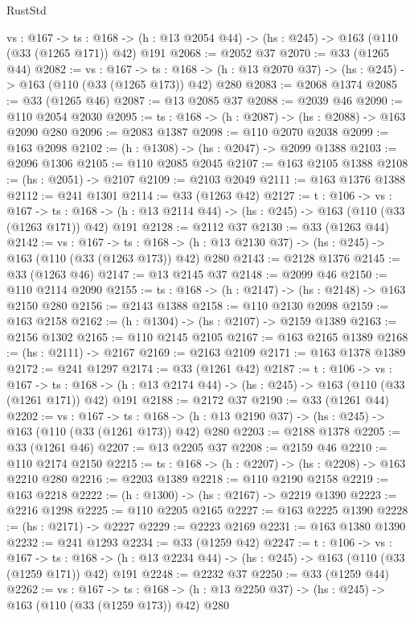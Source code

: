 \begin{lexlean}{RustStd}
\begin{coremodule}
  {vs : @167} ->
  {ts : @168} -> (h : @13 @2054 @44) -> (hs : @245) -> @163 (@110 (@33 (@1265 @171)) @42) @191
@2068 := @2052 @37
@2070 := @33 (@1265 @44)
@2082 := {vs : @167} ->
  {ts : @168} -> (h : @13 @2070 @37) -> (hs : @245) -> @163 (@110 (@33 (@1265 @173)) @42) @280
@2083 := @2068 @1374
@2085 := @33 (@1265 @46)
@2087 := @13 @2085 @37
@2088 := @2039 @46
@2090 := @110 @2054 @2030
@2095 := {ts : @168} -> (h : @2087) -> (hs : @2088) -> @163 @2090 @280
@2096 := @2083 @1387
@2098 := @110 @2070 @2038
@2099 := @163 @2098
@2102 := (h : @1308) -> (hs : @2047) -> @2099 @1388
@2103 := @2096 @1306
@2105 := @110 @2085 @2045
@2107 := @163 @2105 @1388
@2108 := (hs : @2051) -> @2107
@2109 := @2103 @2049
@2111 := @163 @1376 @1388
@2112 := @241 @1301
@2114 := @33 (@1263 @42)
@2127 := {t : @106} ->
  {vs : @167} ->
  {ts : @168} -> (h : @13 @2114 @44) -> (hs : @245) -> @163 (@110 (@33 (@1263 @171)) @42) @191
@2128 := @2112 @37
@2130 := @33 (@1263 @44)
@2142 := {vs : @167} ->
  {ts : @168} -> (h : @13 @2130 @37) -> (hs : @245) -> @163 (@110 (@33 (@1263 @173)) @42) @280
@2143 := @2128 @1376
@2145 := @33 (@1263 @46)
@2147 := @13 @2145 @37
@2148 := @2099 @46
@2150 := @110 @2114 @2090
@2155 := {ts : @168} -> (h : @2147) -> (hs : @2148) -> @163 @2150 @280
@2156 := @2143 @1388
@2158 := @110 @2130 @2098
@2159 := @163 @2158
@2162 := (h : @1304) -> (hs : @2107) -> @2159 @1389
@2163 := @2156 @1302
@2165 := @110 @2145 @2105
@2167 := @163 @2165 @1389
@2168 := (hs : @2111) -> @2167
@2169 := @2163 @2109
@2171 := @163 @1378 @1389
@2172 := @241 @1297
@2174 := @33 (@1261 @42)
@2187 := {t : @106} ->
  {vs : @167} ->
  {ts : @168} -> (h : @13 @2174 @44) -> (hs : @245) -> @163 (@110 (@33 (@1261 @171)) @42) @191
@2188 := @2172 @37
@2190 := @33 (@1261 @44)
@2202 := {vs : @167} ->
  {ts : @168} -> (h : @13 @2190 @37) -> (hs : @245) -> @163 (@110 (@33 (@1261 @173)) @42) @280
@2203 := @2188 @1378
@2205 := @33 (@1261 @46)
@2207 := @13 @2205 @37
@2208 := @2159 @46
@2210 := @110 @2174 @2150
@2215 := {ts : @168} -> (h : @2207) -> (hs : @2208) -> @163 @2210 @280
@2216 := @2203 @1389
@2218 := @110 @2190 @2158
@2219 := @163 @2218
@2222 := (h : @1300) -> (hs : @2167) -> @2219 @1390
@2223 := @2216 @1298
@2225 := @110 @2205 @2165
@2227 := @163 @2225 @1390
@2228 := (hs : @2171) -> @2227
@2229 := @2223 @2169
@2231 := @163 @1380 @1390
@2232 := @241 @1293
@2234 := @33 (@1259 @42)
@2247 := {t : @106} ->
  {vs : @167} ->
  {ts : @168} -> (h : @13 @2234 @44) -> (hs : @245) -> @163 (@110 (@33 (@1259 @171)) @42) @191
@2248 := @2232 @37
@2250 := @33 (@1259 @44)
@2262 := {vs : @167} ->
  {ts : @168} -> (h : @13 @2250 @37) -> (hs : @245) -> @163 (@110 (@33 (@1259 @173)) @42) @280

\end{coremodule}
\end{lexlean}
